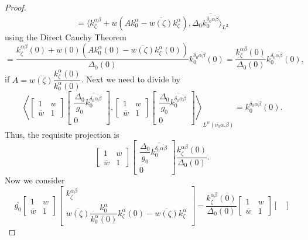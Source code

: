 \documentclass[10pt,a4paper]{amsart}
\def\D{\Delta}
\def\a{\alpha}
\def\b{\beta}
\def\d{\delta}
\newcommand{\z}{\zeta}
\begin{document}
\begin{proof}
$$$$
$$
=\langle
k^{\alpha\beta}_\zeta +
w(A k^\a_0-\overline{w(\zeta)} k^\alpha_\zeta)
,
\D_0 \overline{k^{\d_0\overline{\alpha\b}}_0}
\rangle_{L^2}
$$
using the Direct Cauchy Theorem
$$
=
\dfrac
{k^{\alpha\beta}_\zeta (0)+
w(0)(A k^\a_0(0)-\overline{w(\zeta)} k^\alpha_\zeta(0))}
{\D_0(0)}
k^{\d_0\overline{\alpha\b}}_0(0)
=
\dfrac
{k^{\alpha\beta}_\zeta (0)}
{\D_0(0)}
k^{\d_0\overline{\alpha\b}}_0(0),
$$
if $A=\overline{w(\zeta)} \dfrac{k^\a_\z(0)}{k^\a_0(0)}$.
Next we need to divide by
$$
\left\langle
\begin{bmatrix}
1 & w \\
\overline{w} & 1
\end{bmatrix}
\begin{bmatrix}
\dfrac{\D_0}{g_0}\overline{k^{\d_0\overline{\alpha\b}}_0}
\\
0
\end{bmatrix}
,
\begin{bmatrix}
1 & w \\
\overline{w} & 1
\end{bmatrix}
\begin{bmatrix}
\dfrac{\D_0}{g_0}\overline{k^{\d_0\overline{\alpha\b}}_0}
\\
0
\end{bmatrix}
\right\rangle_{L^w(\overline{\nu_0}\a.\b)}
=k^{\d_0\overline{\alpha\b}}_0(0).
$$
Thus, the requisite projection is
$$
\begin{bmatrix}
1 & w \\
\overline{w} & 1
\end{bmatrix}
\begin{bmatrix}
\dfrac{\D_0}{g_0}\overline{k^{\d_0\overline{\alpha\b}}_0}
\\
0
\end{bmatrix}
\dfrac{k^{\alpha\beta}_\zeta (0)}{\D_0(0)}
.
$$
Now we consider
$$
\overline{g_0}
\left[\begin{array}{cc} 1& w \\
\overline{w} & 1\end{array}\right]\left[\begin{array}{c} k^{\alpha\beta}_\zeta \\
\overline{w(\zeta)} \dfrac{k^\a_0}{k^\a_0(0)}k^\alpha_\zeta(0)-\overline{w(\zeta)} k^\alpha_\zeta \end{array}\right]
-
\dfrac
{k^{\alpha\beta}_\zeta (0)}
{\D_0(0)}
\begin{bmatrix}
1 & w \\
\overline{w} & 1
\end{bmatrix}
\begin{bmatrix}

\end{bmatrix}$$
\end{proof}
\end{document}
